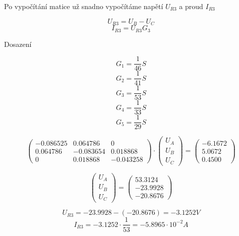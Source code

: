Po vypočítání matice už snadno vypočítáme napětí $U_{R3}$ a proud $I_{R3}$

$$ U_{R3} = U_B - U_C $$
$$ I_{R3} = U_{R3} G_{3} $$

Dosazení

$$ G_1 = \frac{1}{46} S $$
$$ G_2 = \frac{1}{41} S $$
$$ G_3 = \frac{1}{53} S$$
$$ G_4 = \frac{1}{33} S$$
$$ G_5 = \frac{1}{29} S$$

$$
  \begin{pmatrix}
    -0.086525 & 0.064786  & 0         \\
    0.064786  & -0.083654 & 0.018868  \\
    0         & 0.018868  & -0.043258
  \end{pmatrix}
  \cdot
  \begin{pmatrix}
    U_A \\
    U_B \\
    U_C
  \end{pmatrix}
  =
  \begin{pmatrix}
    -6.1672 \\
    5.0672  \\
    0.4500
  \end{pmatrix}
$$

$$
  \begin{pmatrix}
    U_A \\
    U_B \\
    U_C
  \end{pmatrix}
  =
  \begin{pmatrix}
    53.3124  \\
    -23.9928 \\
    -20.8676
  \end{pmatrix}
$$

$$ U_{R3} = -23.9928 - (-20.8676) = -3.1252 V $$
$$ I_{R3} = -3.1252 \cdot \frac{1}{53} = -5.8965 \cdot 10^{-2} A $$
